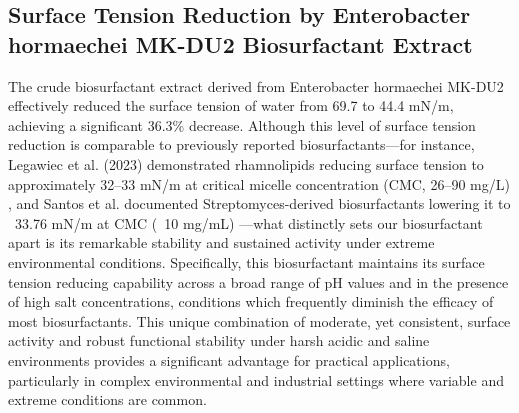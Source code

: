 \documentclass{svjour3}
\begin{document}
\subsection{Surface Tension Reduction by Enterobacter hormaechei MK-DU2 Biosurfactant Extract}
The crude biosurfactant extract derived from Enterobacter hormaechei MK-DU2 effectively reduced the surface tension of water from 69.7 to 44.4 mN/m, achieving a significant 36.3\% decrease. Although this level of surface tension reduction is comparable to previously reported biosurfactants—for instance, Legawiec et al. (2023) demonstrated rhamnolipids reducing surface tension to approximately 32–33 mN/m at critical micelle concentration (CMC, 26–90 mg/L) \cite{52}, and Santos et al. documented Streptomyces-derived biosurfactants lowering it to ~33.76 mN/m at CMC (~10 mg/mL) \cite{53}—what distinctly sets our biosurfactant apart is its remarkable stability and sustained activity under extreme environmental conditions. Specifically, this biosurfactant maintains its surface tension reducing capability across a broad range of pH values and in the presence of high salt concentrations, conditions which frequently diminish the efficacy of most biosurfactants. This unique combination of moderate, yet consistent, surface activity and robust functional stability under harsh acidic and saline environments provides a significant advantage for practical applications, particularly in complex environmental and industrial settings where variable and extreme conditions are common.
\end{document}
